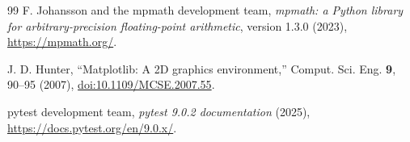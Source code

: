 \begin{thebibliography}{99}
F. Johansson and the mpmath development team, \textit{mpmath: a Python library for arbitrary-precision floating-point arithmetic}, version 1.3.0 (2023), \href{https://mpmath.org/}{https://mpmath.org/}.

J. D. Hunter, ``Matplotlib: A 2D graphics environment,'' Comput. Sci. Eng. \textbf{9}, 90--95 (2007), \href{https://doi.org/10.1109/MCSE.2007.55}{doi:10.1109/MCSE.2007.55}.

pytest development team, \textit{pytest 9.0.2 documentation} (2025), \href{https://docs.pytest.org/en/9.0.x/}{https://docs.pytest.org/en/9.0.x/}.

\end{thebibliography}
